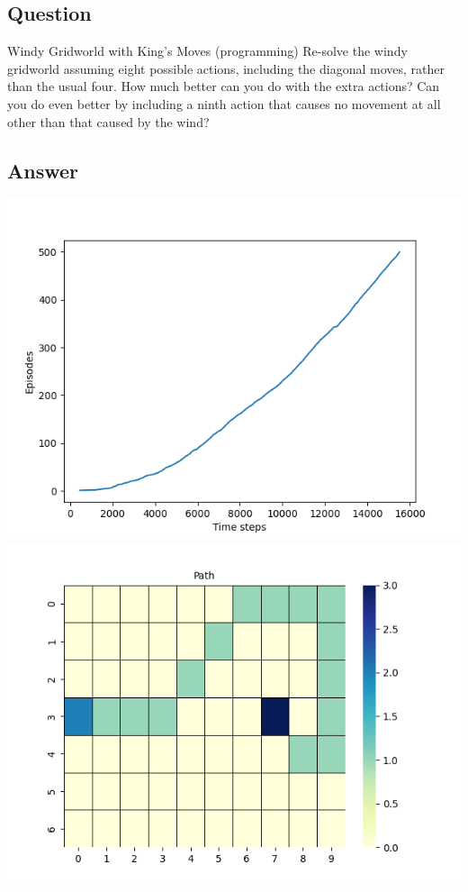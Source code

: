 \documentclass[11pt]{article}
\begin{document}
    \subsection{Question}

    Windy Gridworld with King’s Moves (programming) Re-solve the windy gridworld assuming eight possible actions, including the diagonal moves, rather than the usual four.
    How much better can you do with the extra actions?
    Can you do even better by including a ninth action that causes no movement at all other than that caused by the wind?

    \subsection*{Answer}

    \includegraphics[scale=0.4]{figure_6_3}
    \includegraphics[scale=0.4]{figure_6_3_grid}
\end{document}
